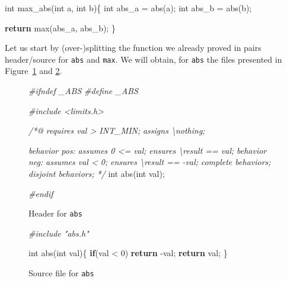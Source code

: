 \documentclass[12pt,francais,]{scrbook}
\newenvironment{Shaded}{}{}
\newcommand{\KeywordTok}[1]{\textcolor[rgb]{0.00,0.44,0.13}{\textbf{{#1}}}}
\newcommand{\DataTypeTok}[1]{\textcolor[rgb]{0.56,0.13,0.00}{{#1}}}
\newcommand{\DecValTok}[1]{\textcolor[rgb]{0.25,0.63,0.44}{{#1}}}
\newcommand{\CommentTok}[1]{\textcolor[rgb]{0.38,0.63,0.69}{\textit{{#1}}}}
\newcommand{\NormalTok}[1]{{#1}}
\begin{document}
\begin{footnotesize}\begin{Shaded}
\begin{Highlighting}[]
\DataTypeTok{int} \NormalTok{max_abs(}\DataTypeTok{int} \NormalTok{a, }\DataTypeTok{int} \NormalTok{b)\{}
  \DataTypeTok{int} \NormalTok{abs_a = abs(a);}
  \DataTypeTok{int} \NormalTok{abs_b = abs(b);}

  \KeywordTok{return} \NormalTok{max(abs_a, abs_b);}
\NormalTok{\}}
\end{Highlighting}
\end{Shaded}\end{footnotesize}

Let us start by (over-)splitting the function we already proved in pairs
header/source for \texttt{abs} and \texttt{max}. We will obtain, for
\texttt{abs} the files presented in Figure~\ref{fig:3-4-hd} and
\ref{fig:3-4-src}.

\begin{figure}
  \centering
\begin{footnotesize}\begin{Shaded}
\begin{Highlighting}[]
\CommentTok{#ifndef _ABS}
\CommentTok{#define _ABS}

\CommentTok{#include <limits.h>}

\CommentTok{/*@}
\CommentTok{  requires val > INT_MIN;}
\CommentTok{  assigns  \textbackslash{}nothing;}

\CommentTok{  behavior pos:}
\CommentTok{    assumes 0 <= val;}
\CommentTok{    ensures \textbackslash{}result == val;}
\CommentTok{  }
\CommentTok{  behavior neg:}
\CommentTok{    assumes val < 0;}
\CommentTok{    ensures \textbackslash{}result == -val;}
\CommentTok{ }
\CommentTok{  complete behaviors;}
\CommentTok{  disjoint behaviors;}
\CommentTok{*/}
\DataTypeTok{int} \NormalTok{abs(}\DataTypeTok{int} \NormalTok{val);}

\CommentTok{#endif}
\end{Highlighting}
\end{Shaded}\end{footnotesize}
\caption{Header for \texttt{abs}}
\label{fig:3-4-hd}
\end{figure}

\begin{figure}
  \centering
\begin{footnotesize}\begin{Shaded}
\begin{Highlighting}[]
\CommentTok{#include "abs.h"}

\DataTypeTok{int} \NormalTok{abs(}\DataTypeTok{int} \NormalTok{val)\{}
  \KeywordTok{if}\NormalTok{(val < }\DecValTok{0}\NormalTok{) }\KeywordTok{return} \NormalTok{-val;}
  \KeywordTok{return} \NormalTok{val;}
\NormalTok{\}}
\end{Highlighting}
\end{Shaded}\end{footnotesize}
\caption{Source file for \texttt{abs}}
\label{fig:3-4-src}
\end{figure}
\end{document}
